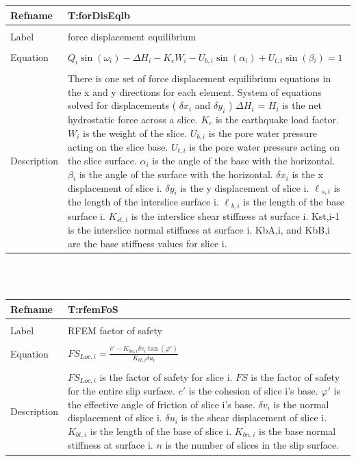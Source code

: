 \documentclass[12pt]{article}
\begin{document}
\noindent \begin{minipage}{\textwidth}
\begin{tabular}{p{} p{}}
\toprule \textbf{Refname} & \textbf{T:forDisEqlb}
\label{T:forDisEqlb}
\\ \midrule \\
Label & force displacement equilibrium
\\ \midrule \\
Equation & $Q_{i}\sin(\omega{}_{i})-\Delta{}H_{i}-K_{c}W_{i}-U_{b,i}\sin(\alpha{}_{i})+U_{t,i}\sin(\beta{}_{i})=1$
\\ \midrule \\
Description & There is one set of force displacement equilibrium equations in the x and y directions for each element. System of equations solved for displacements ( $\delta{}x_{i}$ and $\delta{}y_{i}$ ) $\Delta{}H_{i}$ = $H_{i}$ is the net hydrostatic force across a slice. $K_{c}$ is the earthquake load factor. $W_{i}$ is the weight of the slice. $U_{b,i}$ is the pore water pressure acting on the slice base. $U_{t,i}$ is the pore water pressure acting on the slice surface. $\alpha{}_{i}$ is the angle of the base with the horizontal. $\beta{}_{i}$ is the angle of the surface with the horizontal. $\delta{}x_{i}$ is the x displacement of slice i. $\delta{}y_{i}$ is the y displacement of slice i. $\ell{}_{s,i}$ is the length of the interslice surface i. $\ell{}_{b,i}$ is the length of the base surface i. $K_{st,i}$ is the interslice shear stiffness at surface i.  Kst,i-1 is the interslice normal stiffness at surface i. KbA,i, and KbB,i are the base stiffness values for slice i.
\\ \bottomrule \end{tabular}
\end{minipage}\\
~\newline
\noindent \begin{minipage}{\textwidth}
\begin{tabular}{p{} p{}}
\toprule \textbf{Refname} & \textbf{T:rfemFoS}
\label{T:rfemFoS}
\\ \midrule \\
Label & RFEM factor of safety
\\ \midrule \\
Equation & $FS_{Loc,i}=\frac{c'-K_{bn,i}\delta{}v_{i}\tan(\varphi{}')}{K_{bt,i}\delta{}u_{i}}$
\\ \midrule \\
Description & $FS_{Loc,i}$ is the factor of safety for slice i. $FS$ is the factor of safety for the entire slip surface. $c'$ is the cohesion of slice i's base. $\varphi{}'$ is the effective angle of friction of slice i's base. $\delta{}v_{i}$ is the normal displacement of slice i. $\delta{}u_{i}$ is the shear displacement of slice i. $K_{bt,i}$ is the length of the base of slice i. $K_{bn,i}$ is the base normal stiffness at surface i. $n$ is the number of slices in the slip surface.
\\ \bottomrule \end{tabular}
\end{minipage}\\
\end{document}
